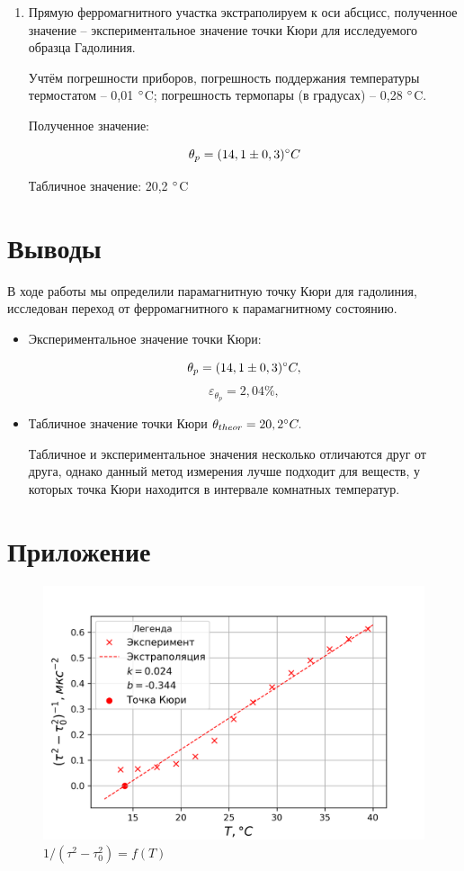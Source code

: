\documentclass[a4paper, 12pt]{article}
\begin{document}
\begin{enumerate}
\item Прямую ферромагнитного участка экстраполируем к оси абсцисс, полученное значение -- экспериментальное значение точки Кюри для исследуемого образца Гадолиния.

Учтём погрешности приборов, погрешность поддержания температуры термостатом -- 0,01 $\degree$C; погрешность термопары (в градусах) -- 0,28 $\degree$C.
 
Полученное значение:

\[\theta_p = (14,1\pm0,3)\degree C\]

Табличное значение: 20,2 $\degree$C

\end{enumerate}

\section{Выводы}

В ходе работы мы определили парамагнитную точку Кюри для гадолиния, исследован переход от ферромагнитного к парамагнитному состоянию.

\begin{itemize}
\item Экспериментальное значение точки Кюри:

\[\theta_p = (14,1\pm0,3)\degree C,\]
\[\varepsilon_{\theta_p} = 2,04 \text{\%},\]

\item Табличное значение точки Кюри $\theta_{theor} = 20,2 \degree C.$

Табличное и экспериментальное значения несколько отличаются друг от друга, однако данный метод измерения лучше подходит для веществ, у которых точка Кюри находится в интервале комнатных температур.
\end{itemize}

\newpage
\section{Приложение}

\begin{figure}[h]
\begin{center}
\includegraphics{graph.png}
\end{center}
\caption{$1/(\tau^2-\tau_0^2) = f(T)$}
\label{Period_graph}
\end{figure}
\end{document}
